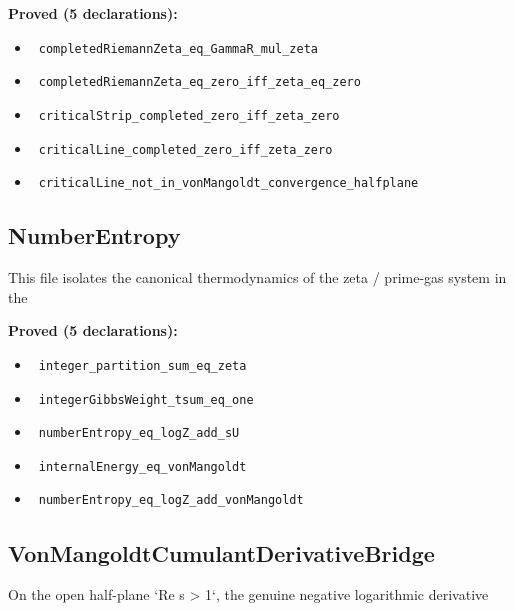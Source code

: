 \documentclass{report}
\theoremstyle{definition}
\begin{document}
\noindent\textbf{Proved (5 declarations):}
\begin{itemize}
  \item {}\leanok\ \texttt{completedRiemannZeta\_eq\_GammaR\_mul\_zeta}
  \item {}\leanok\ \texttt{completedRiemannZeta\_eq\_zero\_iff\_zeta\_eq\_zero}
  \item {}\leanok\ \texttt{criticalStrip\_completed\_zero\_iff\_zeta\_zero}
  \item {}\leanok\ \texttt{criticalLine\_completed\_zero\_iff\_zeta\_zero}
  \item {}\leanok\ \texttt{criticalLine\_not\_in\_vonMangoldt\_convergence\_halfplane}
\end{itemize}

\subsection{NumberEntropy}
This file isolates the canonical thermodynamics of the zeta / prime-gas system in the

\noindent\textbf{Proved (5 declarations):}
\begin{itemize}
  \item {}\leanok\ \texttt{integer\_partition\_sum\_eq\_zeta}
  \item {}\leanok\ \texttt{integerGibbsWeight\_tsum\_eq\_one}
  \item {}\leanok\ \texttt{numberEntropy\_eq\_logZ\_add\_sU}
  \item {}\leanok\ \texttt{internalEnergy\_eq\_vonMangoldt}
  \item {}\leanok\ \texttt{numberEntropy\_eq\_logZ\_add\_vonMangoldt}
\end{itemize}

\subsection{VonMangoldtCumulantDerivativeBridge}
On the open half-plane `Re s > 1`, the genuine negative logarithmic derivative
\end{document}
